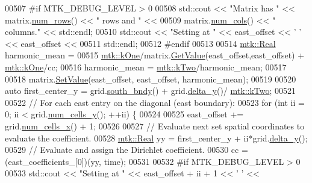 \begin{DoxyCode}
00507 \textcolor{preprocessor}{  #if MTK\_DEBUG\_LEVEL > 0}
00508   std::cout << \textcolor{stringliteral}{"Matrix has "} << matrix.\hyperlink{classmtk_1_1DenseMatrix_a53f3afb3b6a8d21854458aaa9663cc74}{num\_rows}() << \textcolor{stringliteral}{" rows and "} <<
00509     matrix.\hyperlink{classmtk_1_1DenseMatrix_a41747502d468c6728a4be31501b16e0e}{num\_cols}() << \textcolor{stringliteral}{" columns."} << std::endl;
00510   std::cout << \textcolor{stringliteral}{"Setting at "} << east\_offset << \textcolor{charliteral}{' '} << east\_offset <<
00511     std::endl;
00512 \textcolor{preprocessor}{  #endif}
00513 
00514   \hyperlink{group__c01-roots_gac080bbbf5cbb5502c9f00405f894857d}{mtk::Real} harmonic\_mean =
00515     \hyperlink{group__c01-roots_ga26407c24d43b6b95480943340d285c71}{mtk::kOne}/matrix.\hyperlink{classmtk_1_1DenseMatrix_a4b23ecbebd970b5eea915dbb50691024}{GetValue}(east\_offset,east\_offset) + 
      \hyperlink{group__c01-roots_ga26407c24d43b6b95480943340d285c71}{mtk::kOne}/cc;
00516   harmonic\_mean = \hyperlink{group__c01-roots_gaf39c2d851a2db744f4feb1c5ab3ec2cf}{mtk::kTwo}/harmonic\_mean;
00517 
00518   matrix.\hyperlink{classmtk_1_1DenseMatrix_a784ce5784109ac86bfb9d8562b334b13}{SetValue}(east\_offset, east\_offset, harmonic\_mean);
00519 
00520   \textcolor{keyword}{auto} first\_center\_y = grid.\hyperlink{classmtk_1_1UniStgGrid2D_a1442eaf219f099d0ebf46a170fdebf92}{south\_bndy}() + grid.\hyperlink{classmtk_1_1UniStgGrid2D_a65a78cfc80ffdbeb282ed57af4dc5cb4}{delta\_y}()/
      \hyperlink{group__c01-roots_gaf39c2d851a2db744f4feb1c5ab3ec2cf}{mtk::kTwo};
00521 
00522   \textcolor{comment}{// For each east entry on the diagonal (east boundary):}
00523   \textcolor{keywordflow}{for} (\textcolor{keywordtype}{int} ii = 0; ii < grid.\hyperlink{classmtk_1_1UniStgGrid2D_aed05a801cc9a76dba0ff203cea58a61a}{num\_cells\_y}(); ++ii) \{
00524 
00525     east\_offset += grid.\hyperlink{classmtk_1_1UniStgGrid2D_a2d182866a398aba8e4829590e85bf939}{num\_cells\_x}() + 1;
00526 
00527     \textcolor{comment}{// Evaluate next set spatial coordinates to evaluate the coefficient.}
00528     \hyperlink{group__c01-roots_gac080bbbf5cbb5502c9f00405f894857d}{mtk::Real} yy = first\_center\_y + ii*grid.\hyperlink{classmtk_1_1UniStgGrid2D_a65a78cfc80ffdbeb282ed57af4dc5cb4}{delta\_y}();
00529     \textcolor{comment}{// Evaluate and assign the Dirichlet coefficient.}
00530     cc = (east\_coefficients\_[0])(yy, time);
00531 
00532 \textcolor{preprocessor}{    #if MTK\_DEBUG\_LEVEL > 0}
00533     std::cout << \textcolor{stringliteral}{"Setting at "} << east\_offset + ii + 1 << \textcolor{charliteral}{' '} <<

\end{DoxyCode}
